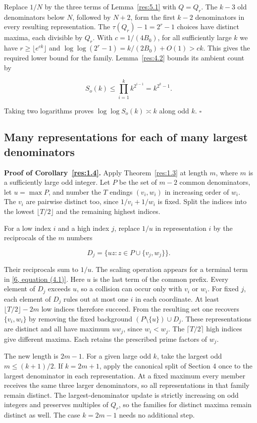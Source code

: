 \documentclass[11pt,a4paper]{article}
\newcounter{result}[section]
\begin{document}
Replace $1/N$ by the three terms of Lemma~\ref{res:5.1} with $Q=Q_r$. The $k-3$ old denominators below $N$, followed by $N+2$, form the first $k-2$ denominators in every resulting representation. The $\tau(Q_r)-1=2^r-1$ choices have distinct maxima, each divisible by $Q_r$. With $c=1/(4B_0)$, for all sufficiently large $k$ we have $r\ge\lfloor e^{ck}\rfloor$ and $\log\log(2^r-1)=k/(2B_0)+O(1)>ck$. This gives the required lower bound for the family. Lemma~\ref{res:4.2} bounds its ambient count by

\[
S_o(k)\le\prod_{i=1}^{k}k^{2^{i-1}}=k^{2^k-1}.
\]

Taking two logarithms proves $\log\log S_o(k)\asymp k$ along odd $k$. $\square$

\subsection{Many representations for each of many largest denominators}

\textbf{Proof of Corollary~\ref{res:1.4}.} Apply Theorem~\ref{res:1.3} at length $m$, where $m$ is a sufficiently large odd integer. Let $P$ be the set of $m-2$ common denominators, let $u=\max P$, and number the $T$ endings $(v_i,w_i)$ in increasing order of $w_i$. The $v_i$ are pairwise distinct too, since $1/v_i+1/w_i$ is fixed. Split the indices into the lowest $\lfloor T/2\rfloor$ and the remaining highest indices.

For a low index $i$ and a high index $j$, replace $1/u$ in representation $i$ by the reciprocals of the $m$ numbers

\[
D_j=\{uz:z\in P\cup\{v_j,w_j\}\}.
\]

Their reciprocals sum to $1/u$. The scaling operation appears for a terminal term in \hyperlink{ref-6}{[6, equation (4.1)]}. Here $u$ is the last term of the common prefix. Every element of $D_j$ exceeds $u$, so a collision can occur only with $v_i$ or $w_i$. For fixed $j$, each element of $D_j$ rules out at most one $i$ in each coordinate. At least $\lfloor T/2\rfloor-2m$ low indices therefore succeed. From the resulting set one recovers $\{v_i,w_i\}$ by removing the fixed background $(P\setminus\{u\})\cup D_j$. These representations are distinct and all have maximum $uw_j$, since $w_i<w_j$. The $\lceil T/2\rceil$ high indices give different maxima. Each retains the prescribed prime factors of $w_j$.

The new length is $2m-1$. For a given large odd $k$, take the largest odd $m\le(k+1)/2$. If $k=2m+1$, apply the canonical split of Section 4 once to the largest denominator in each representation. At a fixed maximum every member receives the same three larger denominators, so all representations in that family remain distinct. The largest-denominator update is strictly increasing on odd integers and preserves multiples of $Q_r$, so the families for distinct maxima remain distinct as well. The case $k=2m-1$ needs no additional step.
\end{document}
